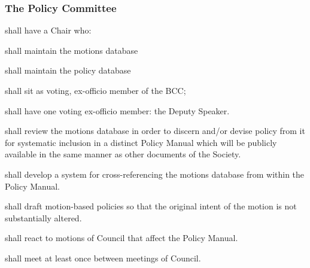 \subsubsection{The Policy Committee}

\begin{longenum}[ label*=\thesubsubsection.\arabic*., align=left]
	\item shall have a Chair who:
    \begin{longenum}[ label*=\arabic*., align=left]
		\item shall maintain the motions database
        \item shall maintain the policy database
        \item shall sit as voting, ex-officio member of the BCC;
	\end{longenum}
    \item shall have one voting ex-officio member: the Deputy 
Speaker.
  
	\item shall review the motions database in order to discern and/or devise policy from it for systematic inclusion in a distinct Policy Manual which will be  publicly available in the same manner as other documents of the Society.
    \item shall develop a system for cross-referencing the motions database from within the Policy Manual.
    \item shall draft motion-based policies so that the original intent of the motion is not substantially altered.
    \item shall react to motions of Council that affect the Policy Manual.
    \item shall meet at least once between meetings of Council.
    
\end{longenum}

